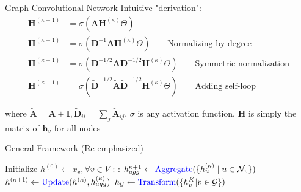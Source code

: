 \documentclass{beamer}
\newcommand{\nhood}{\mathcal{N}}
\newcommand{\Graph}{\mathcal{G}}
\newcommand{\NodeSet}{V}
\newcommand{\node}{v}
\newcommand{\nrepresent}{h}
\newcommand{\NodeRepMat}{\mathbf{H}}
\newcommand{\DegMat}{\mathbf{D}}
\newcommand{\iter}{\kappa}
\newcommand{\Iter}{K}
\newcommand{\AdjMat}{\mathbf{A}}
\newcommand{\Identity}{\mathbf{I}}
\begin{document}
\begin{frame}{Graph Convolutional Network}
Intuitive "derivation": 
\begin{align*}
    \NodeRepMat^{(\iter+1)}
    &=
    \sigma
    \left( 
        \AdjMat \NodeRepMat^{(\iter)} \Theta
    \right) 
\\
    \NodeRepMat^{(\iter+1)}
    &=
    \sigma
    \left( 
        \DegMat^{-1}\AdjMat \NodeRepMat^{(\iter)} \Theta
    \right) 
    \qquad{\text{Normalizing by degree}}
\\
    \NodeRepMat^{(\iter+1)}
    &=
    \sigma
    \left( 
        \DegMat^{-1/2}\AdjMat\DegMat^{-1/2} \NodeRepMat^{(\iter)} \Theta
    \right) 
    \qquad{\text{Symmetric normalization}} %
\\
    \NodeRepMat^{(\iter+1)}
    &=
    \sigma
    \left( 
        \widetilde{\DegMat}^{-1/2}
        \widetilde{\AdjMat}
        \widetilde{\DegMat}^{-1/2} \NodeRepMat^{(\iter)} \Theta
    \right) 
    \qquad{\text{Adding self-loop}}
\end{align*}

where $\widetilde{\AdjMat} = \AdjMat + \Identity, \widetilde{\DegMat}_{ii} = \sum_j \widetilde{\AdjMat}_{ij}$, $\sigma$ is any activation function, $\NodeRepMat$ is simply the matrix of $\mathbf{\nrepresent}_\node$ for all nodes 
\end{frame}



\begin{frame}{General Framework (Re-emphasized)}

    \begin{algorithmic}[1]
    \State Initialize $\nrepresent^{(0)} \gets x_\node, \forall \node \in \NodeSet$ 
        \For{$\iter = 0, ..., \Iter$}:
            \For{$\node \in \Graph$}:
            \State $\nrepresent_{agg}^{\iter+1} \gets \text{\textcolor{blue}{Aggregate}}(\{h_u^{(\iter)} \mid u \in \nhood_\node\})$ 
            \State $\nrepresent^{(\iter+1)} \gets \text{\textcolor{blue}{Update}}(\nrepresent^{(\iter)}, \nrepresent_{agg}^{(\iter)})$
            \EndFor
        \EndFor
        \State $h_\Graph \gets \text{\textcolor{blue}{Transform}}(\{h^\Iter_\node | \node \in \Graph\})$ 
    \end{algorithmic}   

\end{frame}
\end{document}
